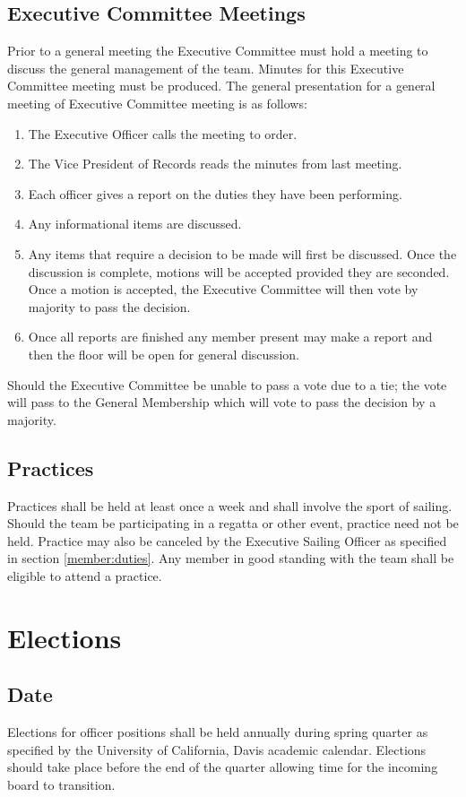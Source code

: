 \documentclass[12pt,titlepage,letter]{article}
\begin{document}
\subsection{Executive Committee Meetings \label{meeting:executive}}
Prior to a general meeting the Executive Committee must hold a meeting to discuss the general management of the team. Minutes for this Executive Committee meeting must be produced. The general presentation for a general meeting of Executive Committee meeting is as follows:
\begin{enumerate}
\item
The Executive Officer calls the meeting to order.
\item
The Vice President of Records reads the minutes from last meeting.
\item
Each officer gives a report on the duties they have been performing.
\item
Any informational items are discussed.
\item
Any items that require a decision to be made will first be discussed. Once the discussion is complete, motions will be accepted provided they are seconded. Once a motion is accepted, the Executive Committee will then vote by majority to pass the decision.
\item
Once all reports are finished any member present may make a report and then the floor will be open for general discussion.
\end{enumerate}
Should the Executive Committee be unable to pass a vote due to a tie; the vote will pass to the General Membership which will vote to pass the decision by a majority.

\subsection{Practices \label{practices}}
Practices shall be held at least once a week and shall involve the sport of sailing. Should the team be participating in a regatta or other event, practice need not be held. Practice may also be canceled by the Executive Sailing Officer as specified in section \ref{member:duties}. Any member in good standing with the team shall be eligible to attend a practice.

\section{Elections \label{elections}}

\subsection{Date}
Elections for officer positions shall be held annually during spring quarter as specified by the University of California, Davis academic calendar. Elections should take place before the end of the quarter allowing time for the incoming board to transition. 
\end{document}
